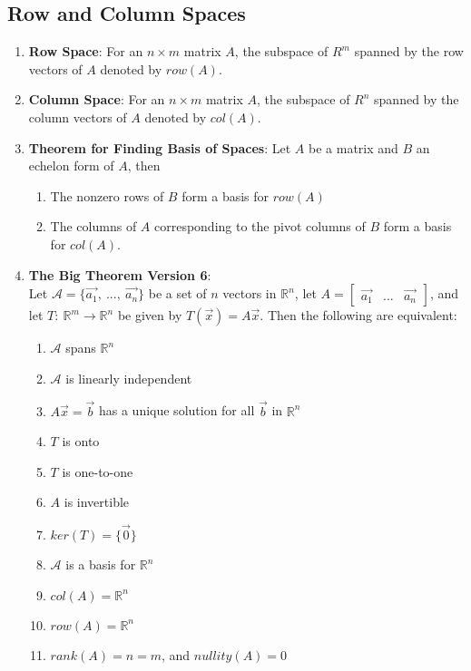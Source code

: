 \documentclass[10pt]{article}
\begin{document}
\subsection{Row and Column Spaces}
\begin{enumerate}
\item \textbf{Row Space}: For an $n \times m$ matrix $A$, the subspace of $R^m$ spanned by the row vectors of $A$ denoted by $row(A)$.
\item \textbf{Column Space}: For an $n \times m$ matrix $A$, the subspace of $R^n$ spanned by the column vectors of $A$ denoted by $col(A)$.
\item \textbf{Theorem for Finding Basis of Spaces}: Let $A$ be a matrix and $B$ an echelon form of $A$, then
\begin{enumerate}
\item The nonzero rows of $B$ form a basis for $row(A)$
\item The columns of $A$ corresponding to the pivot columns of $B$ form a basis for $col(A)$.
\end{enumerate}
\item \textbf{The Big Theorem Version 6}: \\
Let $\mathcal{A} = \lbrace \vec{a_1},\ ...,\ \vec{a_n} \rbrace$ be a set of $n$ vectors in $\mathbb{R}^n$, let $A = \begin{bmatrix}
\vec{a_1} & ... & \vec{a_n}
\end{bmatrix}$, and let $T:\ \mathbb{R}^m \rightarrow \mathbb{R}^n$ be given by $T(\vec{x}) = A\vec{x}$. Then the following are equivalent:
\begin{enumerate}
\item $\mathcal{A}$ spans $\mathbb{R}^n$
\item $\mathcal{A}$ is linearly independent
\item $A\vec{x} = \vec{b}$ has a unique solution for all $\vec{b}$ in $\mathbb{R}^n$
\item $T$ is onto
\item $T$ is one-to-one
\item $A$ is invertible
\item $ker(T) = \lbrace \vec{0} \rbrace$
\item $\mathcal{A}$ is a basis for $\mathbb{R}^n$
\item $col(A) = \mathbb{R}^n$
\item $row(A) = \mathbb{R}^n$
\item $rank(A) = n = m$, and $nullity(A) = 0$
\end{enumerate}
\end{enumerate}
\end{document}
